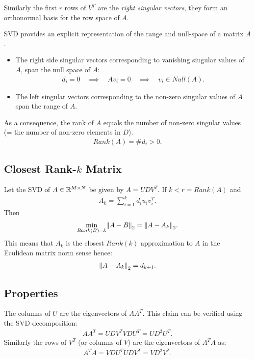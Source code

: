 Similarly the first $r$ rows of $V^T$ are the \emph{right singular vectors}, they form an orthonormal basis for the row space of $A$.

SVD provides an explicit representation of the range and null-space of a matrix $A$.
\begin{itemize}
\item The right side singular vectors corresponding to vanishing singular values of $A$, span the null space of $A$:
\begin{align*}
d_i = 0 \quad \implies \quad Av_i = 0 \quad \implies \quad v_i \in Null(A).
\end{align*}
\item The left singular vectors corresponding to the non-zero singular values of $A$ span the range of $A$.
\end{itemize}
As a consequence, the rank of $A$ equals the number of non-zero singular values (= the number of non-zero elements in $D$).
\begin{align*}
Rank(A) = \# d_i > 0.
\end{align*}
\subsection{Closest Rank-$k$ Matrix}
Let the SVD of $A \in \mathbb{R}^{M\times N}$  be given by $A=UDV^T$. If $k<r = Rank(A)$ and
\begin{align*}
    A_k = \sum_{i=1}^k d_i u_i v_i^T.
\end{align*}
Then 
\begin{align*}
    \min_{Rank(B)=k} \norm{A-B}_2 = \norm{A-A_k}_2.
\end{align*}
This means that $A_k$ is the closest $Rank(k)$ approximation to $A$ in the Eculidean matrix norm sense hence:
\begin{align*}
    \left\lVert A-A_k\right\rVert_2 = d_{k+1}.
\end{align*}

\subsection{Properties}
The columns of $U$ are the eigenvectors of $AA^T$. This claim can be verified using the SVD decomposition:
\begin{align*}
    AA^T = UDV^T VDU^T = UD^2U^T.
\end{align*}
Similarly the rows of $V^T$ (or columns of $V$) are the eigenvectors of $A^TA$ as:
\begin{align*}
    A^TA = VDU^T UDV^T = VD^2V^T.
\end{align*}


